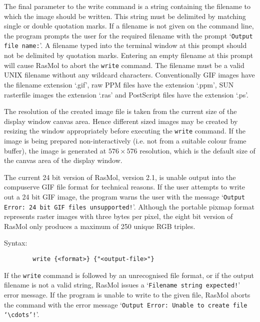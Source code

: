 The final parameter to the write command is a string containing the filename
to which the image should be written. This string must be delimited by 
matching single or double quotation marks. If a filename is not given on the
command line, the program prompts the user for the required filename with 
the prompt `{\tt Output file name:}'. A filename typed into the terminal 
window at this prompt should not be delimited by quotation marks. Entering 
an empty filename at this prompt will cause RasMol to abort the {\tt write} 
command. The filename must be a valid UNIX filename without any wildcard 
characters. Conventionally GIF images have the filename extension `.gif', 
raw PPM files have the extension `.ppm', SUN rasterfile images the extension
`.ras' and PostScript files have the extension `.ps'.

The resolution of the created image file is taken from the current size of
the display window canvas area. Hence different sized images may be created 
by resizing the window appropriately before executing the {\tt write} command.
If the image is being prepared non-interactively (i.e. not from a suitable
colour frame buffer), the image is generated at $576 \times 576$ resolution,
which is the default size of the canvas area of the display window.

The current 24 bit version of RasMol, version 2.1, is unable output into the
compuserve GIF file format for technical reasons. If the user attempts to 
write out a 24 bit GIF image, the program warns the user with the message 
`{\tt Output Error: 24 bit GIF files unsupported!}'. Although the portable 
pixmap format represents raster images with three bytes per pixel, the eight 
bit version of RasMol only produces a maximum of 250 unique RGB triples.

Syntax:
\begin{verbatim}
        write {<format>} {"<output-file>"}
\end{verbatim}

If the {\tt write} command is followed by an unrecognised file format, or if
the output filename is not a valid string, RasMol issues a `{\tt Filename 
string expected!}' error message. If the program is unable to write to the 
given file, RasMol aborts the command with the error message `{\tt Output 
Error: Unable to create file `$\cdots$'!}'. 


